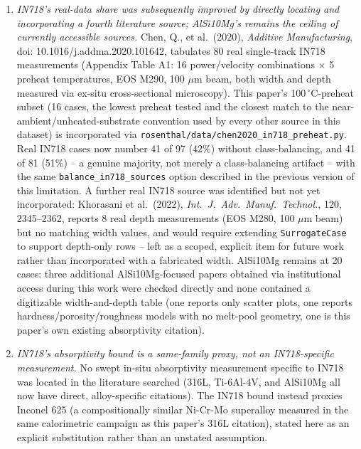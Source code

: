 \documentclass[12pt]{article}
\begin{document}
\begin{enumerate}
\item \emph{IN718's real-data share was subsequently improved by directly locating and incorporating a fourth literature source; AlSi10Mg's remains the ceiling of currently accessible sources.} Chen, Q., et al.\ (2020), \emph{Additive Manufacturing}, doi: 10.1016/j.addma.2020.101642, tabulates 80 real single-track IN718 measurements (Appendix Table A1: 16 power/velocity combinations $\times$ 5 preheat temperatures, EOS M290, 100 $\mu$m beam, both width and depth measured via ex-situ cross-sectional microscopy). This paper's 100\,$^\circ$C-preheat subset (16 cases, the lowest preheat tested and the closest match to the near-ambient/unheated-substrate convention used by every other source in this dataset) is incorporated via \texttt{rosenthal/data/chen2020\_in718\_preheat.py}. Real IN718 cases now number 41 of 97 (42\%) without class-balancing, and 41 of 81 (51\%) -- a genuine majority, not merely a class-balancing artifact -- with the same \texttt{balance\_in718\_sources} option described in the previous version of this limitation. A further real IN718 source was identified but not yet incorporated: Khorasani et al.\ (2022), \emph{Int.\ J.\ Adv.\ Manuf.\ Technol.}, 120, 2345--2362, reports 8 real depth measurements (EOS M280, 100 $\mu$m beam) but no matching width values, and would require extending \texttt{SurrogateCase} to support depth-only rows -- left as a scoped, explicit item for future work rather than incorporated with a fabricated width. AlSi10Mg remains at 20 cases: three additional AlSi10Mg-focused papers obtained via institutional access during this work were checked directly and none contained a digitizable width-and-depth table (one reports only scatter plots, one reports hardness/porosity/roughness models with no melt-pool geometry, one is this paper's own existing absorptivity citation).
\item \emph{IN718's absorptivity bound is a same-family proxy, not an IN718-specific measurement.} No swept in-situ absorptivity measurement specific to IN718 was located in the literature searched (316L, Ti-6Al-4V, and AlSi10Mg all now have direct, alloy-specific citations). The IN718 bound instead proxies Inconel 625 (a compositionally similar Ni-Cr-Mo superalloy measured in the same calorimetric campaign as this paper's 316L citation), stated here as an explicit substitution rather than an unstated assumption.

\end{enumerate}
\end{document}
